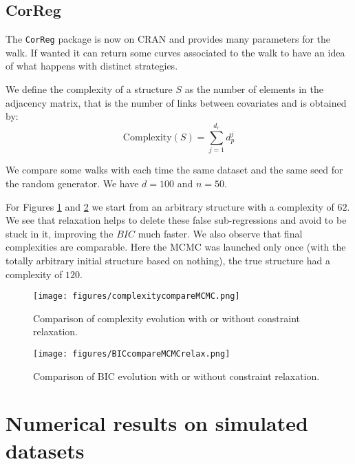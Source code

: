 \documentclass[12pt,a4paper]{report}
\begin{document}
\section{CorReg}	
	The {\tt CorReg} package is now on CRAN and provides many parameters for the walk. If wanted it can return some curves associated to the walk to have an idea of what happens with distinct strategies. 		
	
We define the complexity of a structure $S$ as the number of elements in the adjacency matrix, that is the number of links between covariates and is obtained by:
\begin{equation}
	\textrm{Complexity}(S)=\sum_{j=1}^{d_r}d_p^j
\end{equation}	
	
		We compare some walks with each time the same dataset and the same seed for the random generator. We have $d=100$ and $n=50$.
		
		For Figures \ref{comparecomplrelax} and \ref{compareBICrelax} we start from an arbitrary structure with a complexity of $62$. We see that relaxation helps to delete these false sub-regressions and avoid to be stuck in it, improving the $BIC$ much faster. We also observe that final complexities are comparable. Here the MCMC was launched only once (with the totally arbitrary initial structure based on nothing), the true structure had a complexity of $120$.
\begin{center}
	\begin{figure}[h!]
	\centering
\texttt{[image: figures/complexitycompareMCMC.png]} 		
\caption{Comparison of complexity evolution with or without constraint relaxation.}\label{comparecomplrelax}
	\end{figure}
	\end{center}
			
\begin{center}
	\begin{figure}[h!]
	\centering
\texttt{[image: figures/BICcompareMCMCrelax.png]} 		
\caption{Comparison of BIC evolution with or without constraint relaxation.}\label{compareBICrelax}
	\end{figure}
	\end{center}
			
		
	\chapter{Numerical results on simulated datasets} \label{sectionsimul}
\end{document}
